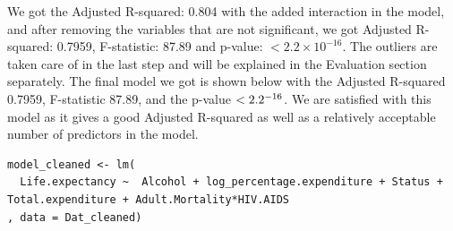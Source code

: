 We got the Adjusted R-squared: 0.804 with the added interaction in the model, and after removing the variables that are not significant, we got Adjusted R-squared: 0.7959, F-statistic: 87.89 and p-value: $< 2.2\times 10^{-16}$. The outliers are taken care of in the last step and will be explained in the Evaluation section separately. The final model we got is shown below with the Adjusted R-squared 0.7959, F-statistic 87.89, and the p-value $< 2.2\time 10^{-16}$. We are satisfied with this model as it gives a good Adjusted R-squared as well as a relatively acceptable number of predictors in the model.

\begin{verbatim}
model_cleaned <- lm(
  Life.expectancy ~  Alcohol + log_percentage.expenditure + Status + Total.expenditure + Adult.Mortality*HIV.AIDS
, data = Dat_cleaned)
\end{verbatim}

